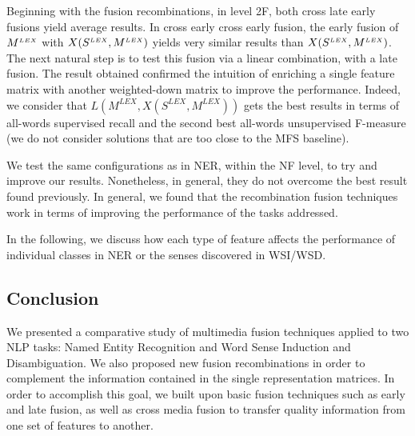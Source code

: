 Beginning with the fusion recombinations, in level 2F, both cross late early fusions yield average results. In cross early cross early fusion, the early fusion of $M^{\scriptscriptstyle LEX}$ with  $X(S^{\scriptscriptstyle LEX}, M^{\scriptscriptstyle LEX})$ yields very similar results than $X(S^{\scriptscriptstyle LEX}, M^{\scriptscriptstyle LEX})$. The next natural step is to test this fusion via a linear combination, with a late fusion. The result obtained confirmed the intuition of enriching a single feature matrix with another weighted-down matrix to improve the performance. Indeed, we consider that $L(M^{LEX}, X(S^{LEX}, M^{LEX}))$ gets the best results in terms of all-words supervised recall and the second best all-words unsupervised F-measure (we do not consider solutions that are too close to the MFS baseline). 

We test the same configurations as in NER, within the NF level, to try and improve our results. Nonetheless, in general, they do not overcome the best result found previously.
In general, we found that the recombination fusion techniques work in terms of improving the performance of the tasks addressed.

In the following, we discuss how each type of feature affects the performance of individual classes in NER or the senses discovered in WSI/WSD.


\subsection{Conclusion}
\label{chap6:conclusion}
We presented  a comparative study of multimedia fusion techniques applied to two NLP tasks: Named Entity Recognition and Word Sense Induction and Disambiguation. We also proposed new fusion recombinations in order to complement the information contained in the single representation matrices. In order to accomplish this goal, we built upon basic fusion techniques such as early and late fusion, as well as cross media fusion to transfer quality information from one set of features to another. 

